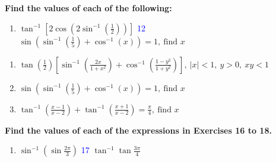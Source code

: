 \documentclass[a4paper,12pt]{article}                                                                       \usepackage{amsmath, amssymb, xcolor, tcolorbox}                                                            \usepackage{geometry}
\begin{document}
\textbf{Find the values of each of the following:}

\begin{enumerate}
    \item[\textcolor{blue}{11}]  $ \tan^{-1}\left[ 2 \cos\left( 2 \sin^{-1}\left( \frac{1}{2} \right) \right) \right] $
    \hspace{1cm}
    \textcolor{blue}{12} $ \sin \left( \sin^{-1}\left( \frac{1}{5} \right) + \cos^{-1}(x) \right) = 1, \ \text{find } x$
\end{enumerate}


\begin{enumerate}
    \item[\textcolor{blue}{13}] $ \tan\left(\frac{1}{2}\right) \left[ \sin^{-1}\left(\frac{2x}{1+x^2}\right) + \cos^{-1}\left(\frac{1-y^2}{1+y^2}\right) \right] , \ |x| < 1, \ y > 0, \ xy < 1$    \item[\textcolor{blue}{14}] $ \sin \left( \sin^{-1}\left( \frac{1}{5} \right) + \cos^{-1}(x) \right) = 1, \ \text{find } x$
    \item[\textcolor{blue}{15}] $ \tan^{-1} \left( \frac{x-1}{x-2} \right) + \tan^{-1} \left( \frac{x+1}{x-2} \right) = \frac{\pi}{4}, \ \text{find } x$
\end{enumerate}

\textbf{Find the values of each of the expressions in Exercises 16 to 18.}

\begin{enumerate}
    \item[\textcolor{blue}{16}] $\sin^{-1} \left( \sin \frac{2\pi}{3} \right)$
    \hspace{1cm}
    \textcolor{blue}{17} $\tan^{-1} \tan \frac{3\pi}{4}$
\end{enumerate}
\end{document}
